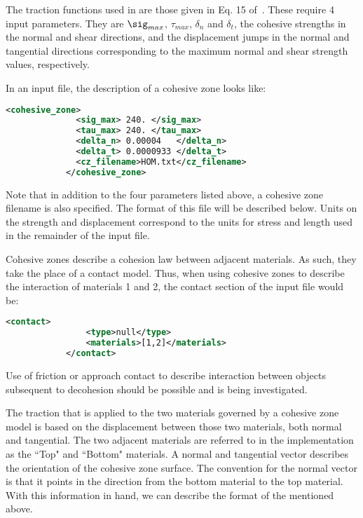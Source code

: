 The traction functions used in \Vaango are those given in Eq. 15
of~\cite{Daphalapurkar}.  These require 4 input parameters.  They are
$\sig_{max}$, $\tau_{max}$, $\delta_n$ and $\delta_t$, the cohesive strengths
in the normal and shear directions, and the displacement jumps in the normal and
tangential directions corresponding to the maximum normal and shear strength
values, respectively.

In an input file, the description of a cohesive zone looks like:

\begin{lstlisting}[language=XML]
            <cohesive_zone>
              <sig_max> 240. </sig_max>
              <tau_max> 240. </tau_max>
              <delta_n> 0.00004   </delta_n>
              <delta_t> 0.0000933 </delta_t>
              <cz_filename>HOM.txt</cz_filename>
            </cohesive_zone>
\end{lstlisting}

Note that in addition to the four parameters listed above, a cohesive zone
filename is also specified.  The format of this file will be described below.
Units on the strength and displacement correspond to the units for
stress and length used in the remainder of the input file.

Cohesive zones describe a cohesion law between adjacent materials. As such,
they take the place of a contact model.  Thus, when using cohesive zones to
describe the interaction of materials 1 and 2, the contact section of the input
file would be:

\begin{lstlisting}[language=XML]
            <contact>
                <type>null</type>
                <materials>[1,2]</materials>
            </contact>
\end{lstlisting}

Use of friction or approach contact to describe interaction between objects
subsequent to decohesion should be possible and is being investigated.

The traction that is applied to the two materials governed by a
cohesive zone model is based on the displacement between those two materials,
both normal and tangential.  The two adjacent materials are referred to in the
implementation as the ``Top" and ``Bottom" materials.  A normal and tangential
vector describes the orientation of the cohesive zone surface.  The convention
for the normal vector is that it points in the direction from the bottom
material to the top material.  With this information in hand, we can describe
the format of the  mentioned above.

